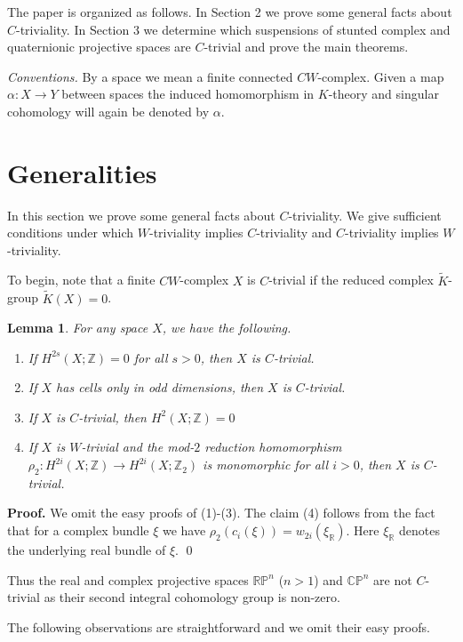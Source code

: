 \documentclass[12pt,reqno]{amsart}
\numberwithin{equation}{subsection}
\newtheorem{Lem}[subsection]{Lemma}
\theoremstyle{definition}
\begin{document}
The paper is organized as follows. In Section 2 we prove some general facts about $C$-triviality. In Section 3 we determine which suspensions of stunted complex and quaternionic projective spaces are $C$-trivial and prove the main theorems. 

{\em Conventions.} By a space we mean a finite connected $CW$-complex. Given a map $\alpha:X\longrightarrow Y$ between spaces the induced homomorphism in $K$-theory and singular cohomology will again be denoted by $\alpha$. 

\section{Generalities}

In this section we prove some general facts about $C$-triviality. We give sufficient conditions under which $W$-triviality implies $C$-triviality and 
$C$-triviality implies $W$-triviality. 

To begin, note that a finite $CW$-complex $X$ is $C$-trivial if the reduced complex $\widetilde{K}$-group $\widetilde{K}(X)=0$.  

\begin{Lem} \label{prelim} For any space $X$, we have the following. 
\begin{enumerate}
\item If $H^{2s}(X;\mathbb Z)=0$ for all $s> 0$, then $X$ is $C$-trivial. 
\item If $X$ has cells only in odd dimensions, then $X$ is $C$-trivial. 
\item If $X$ is $C$-trivial, then $H^2(X;\mathbb Z)=0$
\item If $X$ is $W$-trivial and the mod-$2$ reduction homomorphism $\rho_2:H^{2i}(X;\mathbb Z)\longrightarrow H^{2i}(X;\mathbb Z_2)$ is monomorphic  for all $i>0$, then $X$ is $C$-trivial. 
\end{enumerate}
\end{Lem}
{\bf Proof.} We omit the easy proofs of (1)-(3). The claim  (4) follows from the fact that for a complex bundle $\xi$ we have $\rho_2(c_i(\xi))=w_{2i}(\xi_{\mathbb R})$. Here $\xi_{\mathbb R}$ denotes the underlying real bundle of $\xi$. \qed

Thus the real and complex projective spaces $\mathbb R\mathbb P^n$ ($n>1$) and $\mathbb C\mathbb P^n$ are not $C$-trivial as their second integral cohomology group is non-zero. 

The following observations are straightforward and we omit their easy proofs. 
\end{document}
